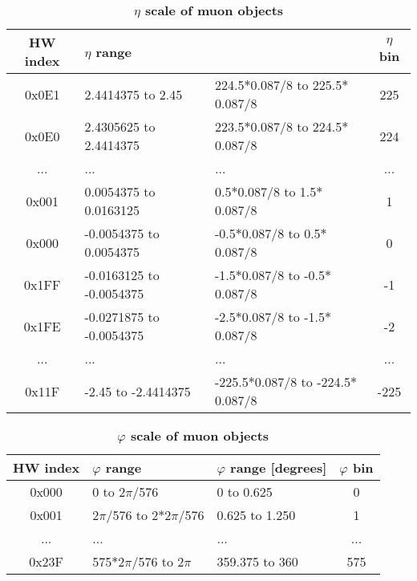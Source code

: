 \documentclass{cmspaper}
\begin{document}
\begin{table}[ht]
\caption{\bf $\eta$ scale of muon objects}
\vspace{5mm}
\centering
\begin{tabular}{|c|l|l|c|}\hline
HW index & $\eta$ range &  & $\eta$ bin\\\hline\hline
0x0E1 & 2.4414375 to 2.45 & 224.5$*$0.087/8 to 225.5$*$0.087/8 & 225\\\hline
0x0E0 & 2.4305625 to 2.4414375 & 223.5$*$0.087/8 to 224.5$*$0.087/8 & 224\\\hline
... & ... & ... & ...\\\hline
0x001 & 0.0054375 to 0.0163125 & 0.5$*$0.087/8 to 1.5$*$0.087/8 & 1\\\hline
0x000 & -0.0054375 to 0.0054375 & -0.5$*$0.087/8 to 0.5$*$0.087/8 & 0\\\hline
0x1FF & -0.0163125 to -0.0054375 & -1.5$*$0.087/8 to -0.5$*$0.087/8 & -1\\\hline
0x1FE & -0.0271875 to -0.0054375 & -2.5$*$0.087/8 to -1.5$*$0.087/8 & -2\\\hline
... & ... & ... & ...\\\hline
0x11F & -2.45 to -2.4414375 & -225.5$*$0.087/8 to -224.5$*$0.087/8 & -225\\\hline
\end{tabular}
\label{table:muon_eta_scale}
\end{table}

\begin{table}[ht]
\caption{\bf $\varphi$ scale of muon objects}
\vspace{5mm}
\centering
\begin{tabular}{|c|l|l|c|}\hline
HW index & $\varphi$ range & $\varphi$ range [degrees] & $\varphi$ bin\\\hline\hline
0x000 & 0 to 2$\pi$/576 & 0 to 0.625 & 0\\\hline
0x001 & 2$\pi$/576 to 2$*$2$\pi$/576 & 0.625 to 1.250 & 1\\\hline
... & ... & ... & ...\\\hline
0x23F & 575$*$2$\pi$/576 to 2$\pi$ & 359.375 to 360 & 575\\\hline
\end{tabular}
\label{table:muon_phi_scale}
\end{table}
\end{document}

